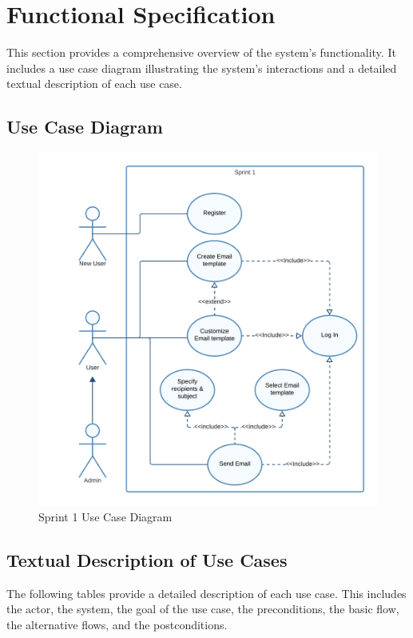 \section{Functional Specification}

This section provides a comprehensive overview of the system's functionality. It includes a use case diagram illustrating the system's interactions and a detailed textual description of each use case.

\subsection{Use Case Diagram}

\begin{figure}[ht]
	\centering
	\includegraphics[width=\linewidth]{Images//images/sprint 1 use case diagram.png}
	\caption{Sprint 1 Use Case Diagram}
	\label{fig:Sprint 1 Use Case Diagram}
\end{figure}

\subsection{Textual Description of Use Cases}

The following tables provide a detailed description of each use case. This includes the actor, the system, the goal of the use case, the preconditions, the basic flow, the alternative flows, and the postconditions.

